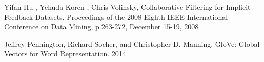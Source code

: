 \documentclass{article}
\begin{document}




\begin{thebibliography}{99} %

Yifan Hu , Yehuda Koren , Chris Volinsky, Collaborative Filtering for Implicit Feedback Datasets, Proceedings of the 2008 Eighth IEEE International Conference on Data Mining, p.263-272, December 15-19, 2008

Jeffrey Pennington, Richard Socher, and Christopher D. Manning. GloVe: Global Vectors for Word Representation. 2014
\end{thebibliography}

\end{document}
